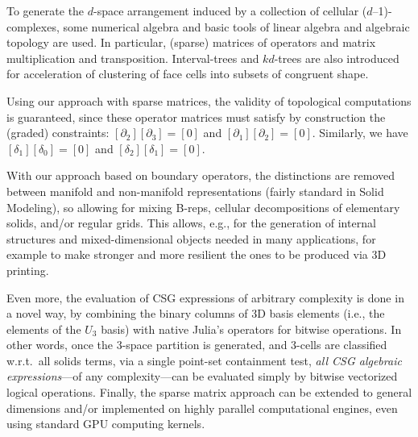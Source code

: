 To generate the $d$-space arrangement induced by a collection of cellular ($d$--1)-complexes, some numerical algebra and basic tools of linear algebra and algebraic topology are used. In particular, (sparse) matrices of operators and matrix multiplication and transposition. Interval-trees and $kd$-trees are also introduced for acceleration of clustering of face cells into subsets of congruent shape. 

Using our approach with sparse matrices, the validity of topological computations is guaranteed, since these operator matrices must satisfy by construction the (graded) constraints: $[\partial_2][\partial_3]=[0]$ and $[\partial_1][\partial_2]=[0]$.  Similarly, we have $[\delta_1][\delta_0]=[0]$ and $[\delta_2][\delta_1]=[0]$.

With our approach based on boundary operators, the distinctions are removed between manifold and non-manifold representations (fairly standard in Solid Modeling), so allowing for mixing B-reps, cellular decompositions of elementary solids, and/or regular grids. This allows, e.g., for the generation of internal structures and mixed-dimensional objects needed in many applications, for example to make stronger and more resilient the ones to be produced via 3D printing.

Even more, the evaluation of CSG expressions of arbitrary complexity is done in a novel way, by combining the binary columns of 3D basis elements (i.e., the elements of the $U_3$ basis) with native Julia's operators for bitwise operations. In other words, once the $3$-space partition is generated, and $3$-cells are classified w.r.t.~all solids terms, via a single point-set containment test,  \emph{all CSG algebraic  expressions}---of any complexity---can be  evaluated simply by bitwise vectorized logical operations. 
Finally, the sparse matrix approach can be extended to general dimensions and/or implemented on highly parallel computational engines, even using standard GPU computing kernels.


